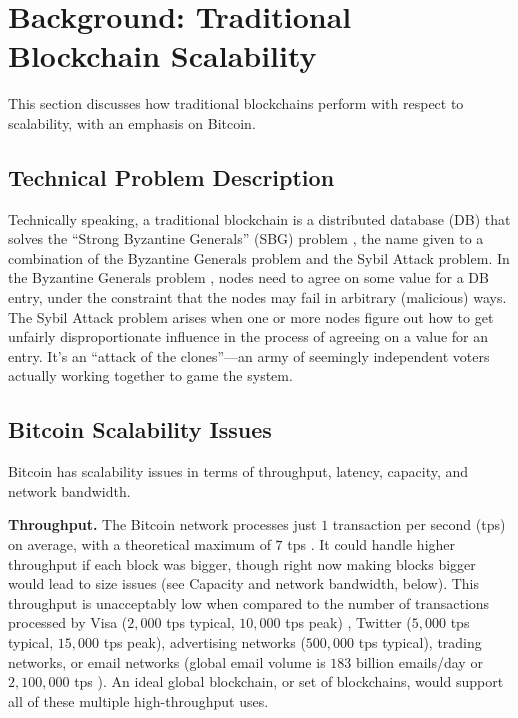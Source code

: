 \section{Background: Traditional Blockchain Scalability}\label{sec:background}

This section discusses how traditional blockchains perform with respect to scalability, with an emphasis on Bitcoin.

\subsection{Technical Problem Description}
Technically speaking, a traditional blockchain is a distributed database (DB) that solves the “Strong Byzantine Generals” (SBG) problem \cite{koshy2014revolution}, the name given to a combination of the Byzantine Generals problem and the Sybil Attack problem.
In the Byzantine Generals problem \cite{lamport1982byzantine}, nodes need to agree on some value for a DB entry, under the constraint that the nodes may fail in arbitrary (malicious) ways.
The Sybil Attack problem \cite{douceur2002sybil} arises when one or more nodes figure out how to get unfairly disproportionate influence in the process of agreeing on a value for an entry.
It’s an “attack of the clones”—an army of seemingly independent voters actually working together to game the system.

\subsection{Bitcoin Scalability Issues}
Bitcoin has scalability issues in terms of throughput, latency, capacity, and network bandwidth.

\medskip
\noindent\textbf{Throughput.} The Bitcoin network processes just $1$ transaction per second (tps) on average, with a theoretical maximum of $7$ tps \cite{bitcoin2015scalability}.
It could handle higher throughput if each block was bigger, though right now making blocks bigger would lead to size issues (see Capacity and network bandwidth, below).
This throughput is unacceptably low when compared to the number of transactions processed by Visa ($2,000$ tps typical, $10,000$ tps peak) \cite{trillo2013visa}, Twitter ($5,000$ tps typical, $15,000$ tps peak), advertising networks ($500,000$ tps typical), trading networks, or email networks (global email volume is $183$ billion emails/day or $2,100,000$ tps \cite{sourabh2014email}).
An ideal global blockchain, or set of blockchains, would support all of these multiple high-throughput uses.

